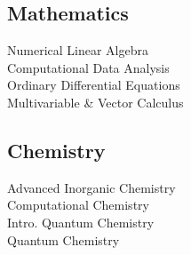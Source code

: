 \documentclass[letterpaper]{deedy-resume} %
\begin{document}
\begin{minipage}[t]{0.32\textwidth}
\sectionspace

\subsection{Mathematics}
\sectionspace
\textbullet{}Numerical Linear Algebra\\
\textbullet{}Computational Data Analysis\\
\textbullet{}Ordinary Differential Equations\\
\textbullet{}Multivariable \& Vector Calculus
\sectionspace

\subsection{Chemistry}
\sectionspace
\textbullet{}Advanced Inorganic Chemistry\\
\textbullet{}Computational Chemistry\\
\textbullet{}Intro. Quantum Chemistry\\
\textbullet{}Quantum Chemistry

\end{minipage} %
\vspace{0pt}
\end{document}
